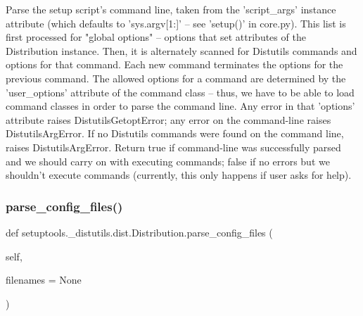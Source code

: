 \begin{DoxyVerb}Parse the setup script's command line, taken from the
'script_args' instance attribute (which defaults to 'sys.argv[1:]'
-- see 'setup()' in core.py).  This list is first processed for
"global options" -- options that set attributes of the Distribution
instance.  Then, it is alternately scanned for Distutils commands
and options for that command.  Each new command terminates the
options for the previous command.  The allowed options for a
command are determined by the 'user_options' attribute of the
command class -- thus, we have to be able to load command classes
in order to parse the command line.  Any error in that 'options'
attribute raises DistutilsGetoptError; any error on the
command-line raises DistutilsArgError.  If no Distutils commands
were found on the command line, raises DistutilsArgError.  Return
true if command-line was successfully parsed and we should carry
on with executing commands; false if no errors but we shouldn't
execute commands (currently, this only happens if user asks for
help).
\end{DoxyVerb}
 \mbox{\label{classsetuptools_1_1__distutils_1_1dist_1_1Distribution_aef1afa2f30e403b98643588817549d29}} 
\subsubsection{\texorpdfstring{parse\+\_\+config\+\_\+files()}{parse\_config\_files()}}
{\footnotesize\ttfamily def setuptools.\+\_\+distutils.\+dist.\+Distribution.\+parse\+\_\+config\+\_\+files (\begin{DoxyParamCaption}\item[{}]{self,  }\item[{}]{filenames = {\ttfamily None} }\end{DoxyParamCaption})}

\mbox{\label{classsetuptools_1_1__distutils_1_1dist_1_1Distribution_a71d112e0e1ce0730be31fd1085e72386}} 
